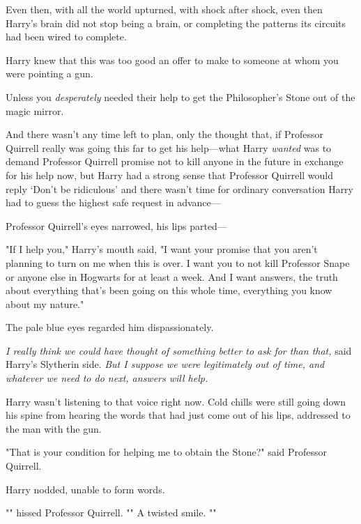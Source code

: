 Even then, with all the world upturned, with shock after shock, even then 
Harry's brain did not stop being a brain, or completing the patterns its 
circuits had been wired to complete.

Harry knew that this was too good an offer to make to someone at whom you were 
pointing a gun.

Unless you \emph{desperately} needed their help to get the Philosopher's Stone 
out of the magic mirror.

And there wasn't any time left to plan, only the thought that, if Professor 
Quirrell really was going this far to get his help---what Harry \emph{wanted} 
was to demand Professor Quirrell promise not to kill anyone in the future in 
exchange for his help now, but Harry had a strong sense that Professor Quirrell 
would reply `Don't be ridiculous' and there wasn't time for ordinary 
conversation Harry had to guess the highest safe request in advance---

Professor Quirrell's eyes narrowed, his lips parted---

"If I help you," Harry's mouth said, "I want your promise that you aren't 
planning to turn on me when this is over. I want you to not kill Professor 
Snape or anyone else in Hogwarts for at least a week. And I want answers, the 
truth about everything that's been going on this whole time, everything you 
know about my nature."

The pale blue eyes regarded him dispassionately.

\emph{I really think we could have thought of something better to ask for than 
that,} said Harry's Slytherin side. \emph{But I suppose we were legitimately 
out of time, and whatever we need to do next, answers will help.}

Harry wasn't listening to that voice right now. Cold chills were still going 
down his spine from hearing the words that had just come out of his lips, 
addressed to the man with the gun.

"That is your condition for helping me to obtain the Stone?" said Professor 
Quirrell.

Harry nodded, unable to form words.

"" hissed Professor Quirrell. "" A twisted smile. ""

